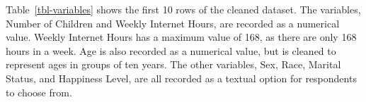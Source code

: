 \documentclass[
]{article}
\begin{document}
Table~\ref{tbl-variables} shows the first 10 rows of the cleaned
dataset. The variables, Number of Children and Weekly Internet Hours,
are recorded as a numerical value. Weekly Internet Hours has a maximum
value of 168, as there are only 168 hours in a week. Age is also
recorded as a numerical value, but is cleaned to represent ages in
groups of ten years. The other variables, Sex, Race, Marital Status, and
Happiness Level, are all recorded as a textual option for respondents to
choose from.

\begin{figure}

\begin{minipage}[t]{0.50\linewidth}

{\centering 


}

\end{minipage}%
%
\begin{minipage}[t]{0.50\linewidth}

{\centering 

}
\end{minipage}
\end{figure}
\end{document}
